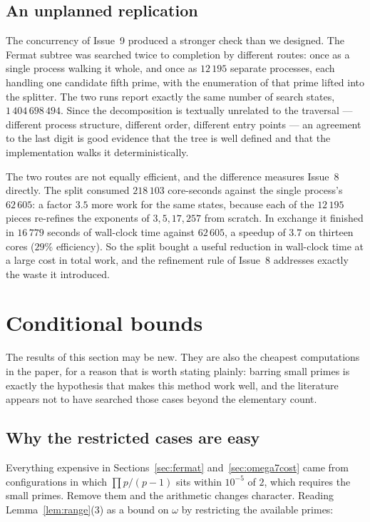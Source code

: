 \documentclass[11pt]{amsart}
\theoremstyle{remark}
\begin{document}
\subsection{An unplanned replication}\label{sec:replication}
The concurrency of Issue~9 produced a stronger check than we designed. The
Fermat subtree was searched twice to completion by different routes: once as a
single process walking it whole, and once as $12\,195$ separate processes, each
handling one candidate fifth prime, with the enumeration of that prime lifted
into the splitter. The two runs report exactly the same number of search
states, $1\,404\,698\,494$. Since the decomposition is textually unrelated to
the traversal --- different process structure, different order, different entry
points --- an agreement to the last digit is good evidence that the tree is
well defined and that the implementation walks it deterministically.

The two routes are not equally efficient, and the difference measures Issue~8
directly. The split consumed $218\,103$ core-seconds against the single
process's $62\,605$: a factor $3.5$ more work for the same states, because each
of the $12\,195$ pieces re-refines the exponents of $3, 5, 17, 257$ from
scratch. In exchange it finished in $16\,779$ seconds of wall-clock time
against $62\,605$, a speedup of $3.7$ on thirteen cores ($29\%$ efficiency).
So the split bought a useful reduction in wall-clock time at a large cost in
total work, and the refinement rule of Issue~8 addresses exactly the waste it
introduced.

\section{Conditional bounds}\label{sec:conditional}

The results of this section may be new. They are also the cheapest computations
in the paper, for a reason that is worth stating plainly: barring small primes is
exactly the hypothesis that makes this method work well, and the literature
appears not to have searched those cases beyond the elementary count.

\subsection{Why the restricted cases are easy}
Everything expensive in Sections~\ref{sec:fermat} and~\ref{sec:omega7cost} came
from configurations in which $\prod p/(p-1)$ sits within $10^{-5}$ of $2$, which
requires the small primes. Remove them and the arithmetic changes character.
Reading Lemma~\ref{lem:range}(3) as a bound on $\omega$ by restricting the
available primes:
\end{document}

